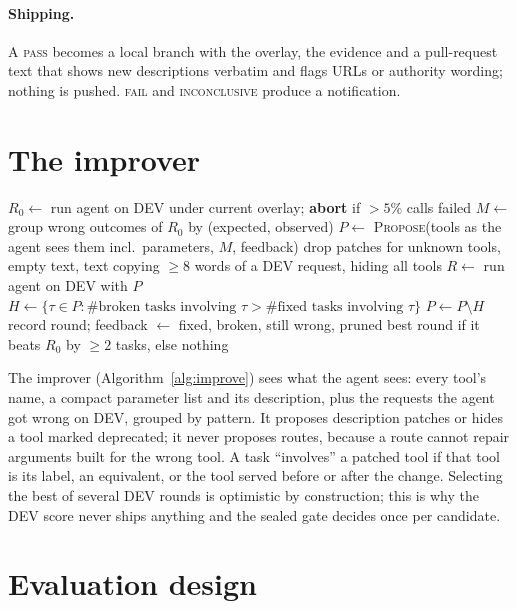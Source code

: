 \documentclass[11pt]{article}
\newcommand{\pass}{\textsc{pass}}
\newcommand{\fail}{\textsc{fail}}
\newcommand{\incon}{\textsc{inconclusive}}
\begin{document}
\paragraph{Shipping.} A \pass{} becomes a local branch with the overlay, the evidence and a pull-request text that shows new
descriptions verbatim and flags URLs or authority wording; nothing is pushed. \fail{} and \incon{} produce a notification.

\section{The improver}\label{sec:improver}

\begin{algorithm}[t]
\caption{Evidence-driven improvement on DEV}\label{alg:improve}
\begin{algorithmic}[1]
\State $R_0 \gets$ run agent on DEV under current overlay; \textbf{abort} if $>5\%$ calls failed
\State $M \gets$ group wrong outcomes of $R_0$ by (expected, observed)
  \State $P \gets$ \textsc{Propose}(tools as the agent sees them incl.\ parameters, $M$, feedback)
  \State drop patches for unknown tools, empty text, text copying $\ge 8$ words of a DEV request, hiding all tools
  \State $R \gets$ run agent on DEV with $P$
  \State $H \gets \{\tau\in P : \#\text{broken tasks involving }\tau > \#\text{fixed tasks involving }\tau\}$
   \State $P \gets P\setminus H$ \EndIf
  \State record round; feedback $\gets$ fixed, broken, still wrong, pruned
\EndFor
\State \Return best round if it beats $R_0$ by $\ge 2$ tasks, else nothing
\end{algorithmic}
\end{algorithm}

The improver (Algorithm~\ref{alg:improve}) sees what the agent sees: every tool's name, a compact parameter list and its
description, plus the requests the agent got wrong on DEV, grouped by pattern. It proposes description patches or hides a tool
marked deprecated; it never proposes routes, because a route cannot repair arguments built for the wrong tool. A task
``involves'' a patched tool if that tool is its label, an equivalent, or the tool served before or after the change.
Selecting the best of several DEV rounds is optimistic by construction; this is why the DEV score never ships anything and the
sealed gate decides once per candidate.

\section{Evaluation design}\label{sec:eval}
\end{document}
